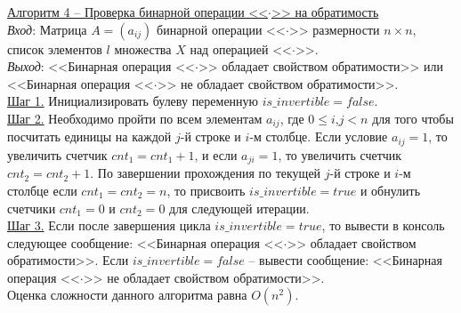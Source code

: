 \documentclass[bachelor, och, labwork]{shiza}
\begin{document}
            \underline{Алгоритм 4 -- Проверка бинарной операции <<$\cdot$>> на обратимость}\\
            \textit{Вход}: Матрица $A = (a_{ij})$ бинарной операции <<$\cdot$>> размерности $n \times n$, список элементов $l$ множества $X$ над
            операцией <<$\cdot$>>.\\
            \textit{Выход}: <<Бинарная операция <<$\cdot$>> обладает свойством обратимости>> или 
            <<Бинарная операция <<$\cdot$>> не обладает свойством обратимости>>.\\
            \underline{Шаг 1.} Инициализировать булеву переменную $is\_invertible = false$.\\
            \underline{Шаг 2.} Необходимо пройти по всем элементам $a_{ij}$, где $0 \leq i$,$j < n$ для того чтобы посчитать единицы на каждой
            $j$-й строке и $i$-м столбце. Если условие $a_{ij} = 1$, то увеличить счетчик $cnt_1 = cnt_1 + 1$, и если $a_{ji} = 1$, то увеличить счетчик 
            $cnt_2 = cnt_2 + 1$. По завершении прохождения по текущей $j$-й строке и $i$-м столбце если $cnt_1 = cnt_2 = n$, то присвоить $is\_invertible = true$
            и обнулить счетчики $cnt_1 = 0$ и $cnt_2 = 0$ для следующей итерации. \\
            \underline{Шаг 3.} Если после завершения цикла $is\_invertible = true$, то вывести в консоль следующее сообщение:
            <<Бинарная операция <<$\cdot$>> обладает свойством обратимости>>. Если $is\_invertible = false$ -- вывести сообщение:
            <<Бинарная операция <<$\cdot$>> не обладает свойством обратимости>>.\\
            
            Оценка сложности данного алгоритма равна $O(n^2)$.\\
            
\end{document}
